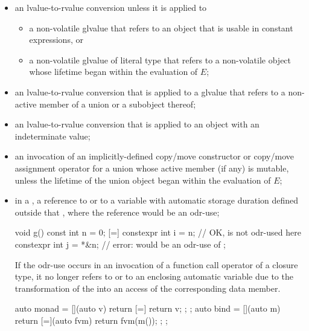 \begin{itemize}
\item
an lvalue-to-rvalue conversion unless
it is applied to
\begin{itemize}
  \item
  a non-volatile glvalue that refers to an object that is
  usable in constant expressions, or

  \item
  a non-volatile glvalue of literal type that refers to a non-volatile object
  whose lifetime began within the evaluation of $E$;
\end{itemize}

\item
an lvalue-to-rvalue conversion
that is applied to a glvalue
that refers to a non-active member of a union or a subobject thereof;

\item
an lvalue-to-rvalue conversion that is applied to
an object with an indeterminate value;

\item
an invocation of an implicitly-defined copy/move constructor or
copy/move assignment operator
for a union whose active member (if any) is mutable,
unless the lifetime of the union object began within the evaluation of $E$;

\item
in a ,
a reference to  or to a variable with
automatic storage duration defined outside that
, where
the reference would be an odr-use;
\begin{example}
\begin{codeblock}
void g() {
  const int n = 0;
  [=] {
    constexpr int i = n;        // OK,  is not odr-used here
    constexpr int j = *&n;      // error:  would be an odr-use of 
  };
}
\end{codeblock}
\end{example}
\begin{note}
If the odr-use occurs in an invocation
of a function call operator of a closure type,
it no longer refers to  or to an enclosing automatic variable
due to the transformation
of the  into
an access of the corresponding data member.
\begin{example}
\begin{codeblock}
auto monad = [](auto v) { return [=] { return v; }; };
auto bind = [](auto m) {
  return [=](auto fvm) { return fvm(m()); };
};


\end{codeblock}
\end{example}
\end{note}
\end{itemize}
